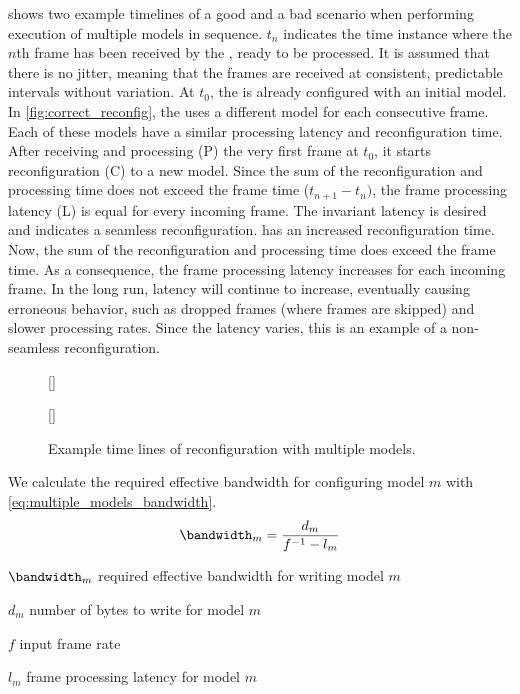  shows two example timelines of a good and a bad scenario when performing execution of multiple models in sequence.
$t_n$ indicates the time instance where the $n$th frame has been received by the \graicore{}, ready to be processed.
It is assumed that there is no jitter, meaning that the frames are received at consistent, predictable intervals without variation.
At $t_0$, the \graicore{} is already configured with an initial model.
In \cref{fig:correct_reconfig}, the \graicore{} uses a different model for each consecutive frame.
Each of these models have a similar processing latency and reconfiguration time.
After receiving and processing (P) the very first frame at $t_0$, it starts reconfiguration (C) to a new model.
Since the sum of the reconfiguration and processing time does not exceed the frame time ($t_{n+1} - t_{n})$, the frame processing latency (L) is equal for every incoming frame.
The invariant latency is desired and indicates a seamless reconfiguration.
 has an increased reconfiguration time.
Now, the sum of the reconfiguration and processing time does exceed the frame time.
As a consequence, the frame processing latency increases for each incoming frame.
In the long run, latency will continue to increase, eventually causing erroneous behavior, such as dropped frames (where frames are skipped) and slower processing rates.
Since the latency varies, this is an example of a non-seamless reconfiguration.

\begin{figure}[hbtp]
    \centering
    [\textwidth]{
        
    }
    [\textwidth]{
        
    }
    \caption{
        Example time lines of reconfiguration with multiple models.
    }
    \label{fig:reconfig_time_line_ex}
\end{figure}

We calculate the required effective bandwidth for configuring model $m$ with \cref{eq:multiple_models_bandwidth}.
\begin{equation}
    \bandwidth_m = \frac{d_m}{f^{-1} - l_m}
    \label{eq:multiple_models_bandwidth}
\end{equation}

\begin{eqexpl}[15mm]
    \item{$\bandwidth_m$} required effective bandwidth for writing model $m$
    \item{$d_m$} number of bytes to write for model $m$
    \item{$f$} input frame rate
    \item{$l_m$} frame processing latency for model $m$
\end{eqexpl}

